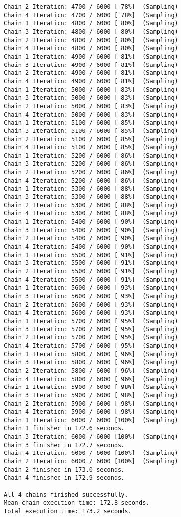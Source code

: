 \documentclass[
  letterpaper,
]{article}
\begin{document}
\begin{verbatim}
Chain 2 Iteration: 4700 / 6000 [ 78%]  (Sampling) 
Chain 4 Iteration: 4700 / 6000 [ 78%]  (Sampling) 
Chain 1 Iteration: 4800 / 6000 [ 80%]  (Sampling) 
Chain 3 Iteration: 4800 / 6000 [ 80%]  (Sampling) 
Chain 2 Iteration: 4800 / 6000 [ 80%]  (Sampling) 
Chain 4 Iteration: 4800 / 6000 [ 80%]  (Sampling) 
Chain 1 Iteration: 4900 / 6000 [ 81%]  (Sampling) 
Chain 3 Iteration: 4900 / 6000 [ 81%]  (Sampling) 
Chain 2 Iteration: 4900 / 6000 [ 81%]  (Sampling) 
Chain 4 Iteration: 4900 / 6000 [ 81%]  (Sampling) 
Chain 1 Iteration: 5000 / 6000 [ 83%]  (Sampling) 
Chain 3 Iteration: 5000 / 6000 [ 83%]  (Sampling) 
Chain 2 Iteration: 5000 / 6000 [ 83%]  (Sampling) 
Chain 4 Iteration: 5000 / 6000 [ 83%]  (Sampling) 
Chain 1 Iteration: 5100 / 6000 [ 85%]  (Sampling) 
Chain 3 Iteration: 5100 / 6000 [ 85%]  (Sampling) 
Chain 2 Iteration: 5100 / 6000 [ 85%]  (Sampling) 
Chain 4 Iteration: 5100 / 6000 [ 85%]  (Sampling) 
Chain 1 Iteration: 5200 / 6000 [ 86%]  (Sampling) 
Chain 3 Iteration: 5200 / 6000 [ 86%]  (Sampling) 
Chain 2 Iteration: 5200 / 6000 [ 86%]  (Sampling) 
Chain 4 Iteration: 5200 / 6000 [ 86%]  (Sampling) 
Chain 1 Iteration: 5300 / 6000 [ 88%]  (Sampling) 
Chain 3 Iteration: 5300 / 6000 [ 88%]  (Sampling) 
Chain 2 Iteration: 5300 / 6000 [ 88%]  (Sampling) 
Chain 4 Iteration: 5300 / 6000 [ 88%]  (Sampling) 
Chain 1 Iteration: 5400 / 6000 [ 90%]  (Sampling) 
Chain 3 Iteration: 5400 / 6000 [ 90%]  (Sampling) 
Chain 2 Iteration: 5400 / 6000 [ 90%]  (Sampling) 
Chain 4 Iteration: 5400 / 6000 [ 90%]  (Sampling) 
Chain 1 Iteration: 5500 / 6000 [ 91%]  (Sampling) 
Chain 3 Iteration: 5500 / 6000 [ 91%]  (Sampling) 
Chain 2 Iteration: 5500 / 6000 [ 91%]  (Sampling) 
Chain 4 Iteration: 5500 / 6000 [ 91%]  (Sampling) 
Chain 1 Iteration: 5600 / 6000 [ 93%]  (Sampling) 
Chain 3 Iteration: 5600 / 6000 [ 93%]  (Sampling) 
Chain 2 Iteration: 5600 / 6000 [ 93%]  (Sampling) 
Chain 4 Iteration: 5600 / 6000 [ 93%]  (Sampling) 
Chain 1 Iteration: 5700 / 6000 [ 95%]  (Sampling) 
Chain 3 Iteration: 5700 / 6000 [ 95%]  (Sampling) 
Chain 2 Iteration: 5700 / 6000 [ 95%]  (Sampling) 
Chain 4 Iteration: 5700 / 6000 [ 95%]  (Sampling) 
Chain 1 Iteration: 5800 / 6000 [ 96%]  (Sampling) 
Chain 3 Iteration: 5800 / 6000 [ 96%]  (Sampling) 
Chain 2 Iteration: 5800 / 6000 [ 96%]  (Sampling) 
Chain 4 Iteration: 5800 / 6000 [ 96%]  (Sampling) 
Chain 1 Iteration: 5900 / 6000 [ 98%]  (Sampling) 
Chain 3 Iteration: 5900 / 6000 [ 98%]  (Sampling) 
Chain 2 Iteration: 5900 / 6000 [ 98%]  (Sampling) 
Chain 4 Iteration: 5900 / 6000 [ 98%]  (Sampling) 
Chain 1 Iteration: 6000 / 6000 [100%]  (Sampling) 
Chain 1 finished in 172.6 seconds.
Chain 3 Iteration: 6000 / 6000 [100%]  (Sampling) 
Chain 3 finished in 172.7 seconds.
Chain 4 Iteration: 6000 / 6000 [100%]  (Sampling) 
Chain 2 Iteration: 6000 / 6000 [100%]  (Sampling) 
Chain 2 finished in 173.0 seconds.
Chain 4 finished in 172.9 seconds.

All 4 chains finished successfully.
Mean chain execution time: 172.8 seconds.
Total execution time: 173.2 seconds.
\end{verbatim}
\end{document}
